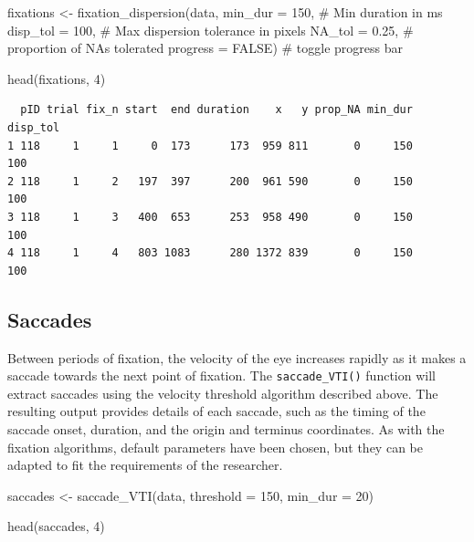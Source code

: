 \documentclass[
  man,
  floatsintext,
  longtable,
  nolmodern,
  notxfonts,
  notimes,
  colorlinks=true,linkcolor=blue,citecolor=blue,urlcolor=blue]{apa7}
\newenvironment{Shaded}{\begin{snugshade}}{\end{snugshade}}
\newcommand{\AttributeTok}[1]{\textcolor[rgb]{0.40,0.45,0.13}{#1}}
\newcommand{\CommentTok}[1]{\textcolor[rgb]{0.37,0.37,0.37}{#1}}
\newcommand{\ConstantTok}[1]{\textcolor[rgb]{0.56,0.35,0.01}{#1}}
\newcommand{\DecValTok}[1]{\textcolor[rgb]{0.68,0.00,0.00}{#1}}
\newcommand{\FloatTok}[1]{\textcolor[rgb]{0.68,0.00,0.00}{#1}}
\newcommand{\FunctionTok}[1]{\textcolor[rgb]{0.28,0.35,0.67}{#1}}
\newcommand{\NormalTok}[1]{\textcolor[rgb]{0.00,0.23,0.31}{#1}}
\newcommand{\OtherTok}[1]{\textcolor[rgb]{0.00,0.23,0.31}{#1}}
\begin{document}
\begin{Shaded}
\begin{Highlighting}[]
\NormalTok{fixations }\OtherTok{\textless{}{-}} 
  \FunctionTok{fixation\_dispersion}\NormalTok{(data,}
                      \AttributeTok{min\_dur =} \DecValTok{150}\NormalTok{, }\CommentTok{\# Min duration in ms}
                      \AttributeTok{disp\_tol =} \DecValTok{100}\NormalTok{, }\CommentTok{\# Max dispersion tolerance in pixels}
                      \AttributeTok{NA\_tol =} \FloatTok{0.25}\NormalTok{, }\CommentTok{\# proportion of NAs tolerated }
                      \AttributeTok{progress =} \ConstantTok{FALSE}\NormalTok{) }\CommentTok{\# toggle progress bar}
                   

\FunctionTok{head}\NormalTok{(fixations, }\DecValTok{4}\NormalTok{)}
\end{Highlighting}
\end{Shaded}

\begin{verbatim}
  pID trial fix_n start  end duration    x   y prop_NA min_dur disp_tol
1 118     1     1     0  173      173  959 811       0     150      100
2 118     1     2   197  397      200  961 590       0     150      100
3 118     1     3   400  653      253  958 490       0     150      100
4 118     1     4   803 1083      280 1372 839       0     150      100
\end{verbatim}

\subsection{Saccades}\label{saccades}

Between periods of fixation, the velocity of the eye increases rapidly
as it makes a saccade towards the next point of fixation. The
\texttt{saccade\_VTI()} function will extract saccades using the
velocity threshold algorithm described above. The resulting output
provides details of each saccade, such as the timing of the saccade
onset, duration, and the origin and terminus coordinates. As with the
fixation algorithms, default parameters have been chosen, but they can
be adapted to fit the requirements of the researcher.

\begin{Shaded}
\begin{Highlighting}[]
\NormalTok{saccades }\OtherTok{\textless{}{-}} \FunctionTok{saccade\_VTI}\NormalTok{(data,}
                        \AttributeTok{threshold =} \DecValTok{150}\NormalTok{,}
                        \AttributeTok{min\_dur =} \DecValTok{20}\NormalTok{)}

\FunctionTok{head}\NormalTok{(saccades, }\DecValTok{4}\NormalTok{)}
\end{Highlighting}
\end{Shaded}
\end{document}

